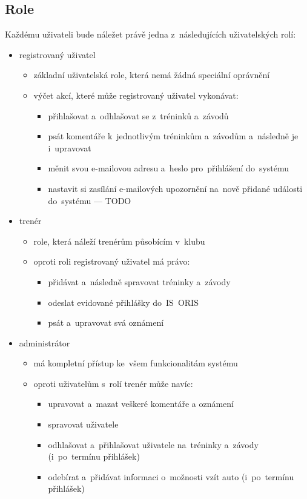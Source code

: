 \subsection{Role}
\label{section:role}
Každému uživateli bude náležet právě jedna z~následujících uživatelských rolí:
\begin{itemize}
	\item registrovaný uživatel
	\begin{itemize}
		\item základní uživatelská role, která nemá žádná speciální oprávnění
		\item výčet akcí, které může registrovaný uživatel vykonávat:
		\begin{itemize}
			\item přihlašovat a~odhlašovat se z~tréninků a~závodů
			\item psát komentáře k~jednotlivým tréninkům a~závodům a~následně je i~upravovat
			\item měnit svou e-mailovou adresu a~heslo pro~přihlášení do~systému
			\item nastavit si zasílání e-mailových upozornění na~nově přidané události do~systému --- TODO
		\end{itemize}
	\end{itemize}
	\item trenér
	\begin{itemize}
		\item role, která náleží trenérům působícím v~klubu
		\item oproti roli registrovaný uživatel má právo:
		\begin{itemize}
			\item přidávat a~následně spravovat tréninky a~závody
			\item odeslat evidované přihlášky do~IS~ORIS
			\item psát a~upravovat svá oznámení
		\end{itemize}
	\end{itemize}
	\item administrátor
	\begin{itemize}
		\item má kompletní přístup ke~všem funkcionalitám systému
		\item oproti uživatelům s~rolí trenér může navíc:
		\begin{itemize}
			\item upravovat a~mazat veškeré komentáře a oznámení
			\item spravovat uživatele
			\item odhlašovat a~přihlašovat uživatele na~tréninky a~závody (i~po~termínu přihlášek)
			\item odebírat a~přidávat informaci o~možnosti vzít auto (i~po~termínu přihlášek)
		\end{itemize}
	\end{itemize}
\end{itemize}
